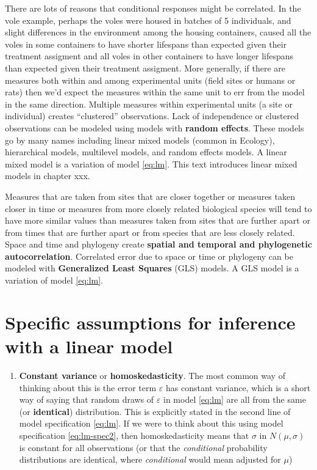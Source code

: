 \documentclass[]{book}
\providecommand{\tightlist}{%
  \setlength{\itemsep}{0pt}\setlength{\parskip}{0pt}}
\begin{document}
There are lots of reasons that conditional responses might be correlated. In the vole example, perhaps the voles were housed in batches of 5 individuals, and slight differences in the environment among the housing containers, caused all the voles in some containers to have shorter lifespans than expected given their treatment assigment and all voles in other containers to have longer lifespans than expected given their treatment assigment. More generally, if there are measures both within and among experimental units (field sites or humans or rats) then we'd expect the measures within the same unit to err from the model in the same direction. Multiple measures within experimental units (a site or individual) creates ``clustered'' observations. Lack of independence or clustered observations can be modeled using models with \textbf{random effects}. These models go by many names including linear mixed models (common in Ecology), hierarchical models, multilevel models, and random effects models. A linear mixed model is a variation of model \eqref{eq:lm}. This text introduces linear mixed models in chapter xxx.

Measures that are taken from sites that are closer together or measures taken closer in time or measures from more closely related biological species will tend to have more similar values than measures taken from sites that are further apart or from times that are further apart or from species that are less closely related. Space and time and phylogeny create \textbf{spatial and temporal and phylogenetic autocorrelation}. Correlated error due to space or time or phylogeny can be modeled with \textbf{Generalized Least Squares} (GLS) models. A GLS model is a variation of model \eqref{eq:lm}.

\hypertarget{specific-assumptions-for-inference-with-a-linear-model}{%
\section{Specific assumptions for inference with a linear model}\label{specific-assumptions-for-inference-with-a-linear-model}}

\begin{enumerate}
\def\labelenumi{\arabic{enumi}.}
\tightlist
\item
  \textbf{Constant variance} or \textbf{homoskedasticity}. The most common way of thinking about this is the error term \(\varepsilon\) has constant variance, which is a short way of saying that random draws of \(\varepsilon\) in model \eqref{eq:lm} are all from the same (or \textbf{identical}) distribution. This is explicitly stated in the second line of model specification \eqref{eq:lm}. If we were to think about this using model specification \eqref{eq:lm-spec2}, then homoskedasticity means that \(\sigma\) in \(N(\mu, \sigma)\) is constant for all observations (or that the \emph{conditional} probability distributions are identical, where \emph{conditional} would mean adjusted for \(\mu\))
\end{enumerate}
\end{document}
